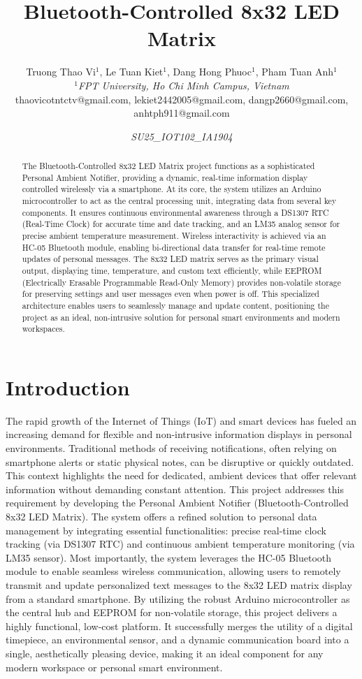 \documentclass[a4paper, 10pt]{article}
\title{\textbf{Bluetooth-Controlled 8x32 LED Matrix}}
\author{
	Truong Thao Vi$^{1}$, Le Tuan Kiet$^{1}$, Dang Hong Phuoc$^{1}$, Pham Tuan Anh$^{1}$ \\
	\small \textit{$^{1}$FPT University, Ho Chi Minh Campus, Vietnam} \\
	\small thaovicotntctv@gmail.com, lekiet2442005@gmail.com, dangp2660@gmail.com, anhtph911@gmail.com
}
\date{\textit{SU25\_IOT102\_IA1904}} %
\begin{document}
	
	\maketitle
	
	\begin{abstract}
		The Bluetooth-Controlled 8x32 LED Matrix project functions as a sophisticated Personal Ambient Notifier, providing a dynamic, real-time information display controlled wirelessly via a smartphone. At its core, the system utilizes an Arduino microcontroller to act as the central processing unit, integrating data from several key components. It ensures continuous environmental awareness through a DS1307 RTC (Real-Time Clock) for accurate time and date tracking, and an LM35 analog sensor for precise ambient temperature measurement. Wireless interactivity is achieved via an HC-05 Bluetooth module, enabling bi-directional data transfer for real-time remote updates of personal messages. The 8x32 LED matrix serves as the primary visual output, displaying time, temperature, and custom text efficiently, while EEPROM (Electrically Erasable Programmable Read-Only Memory) provides non-volatile storage for preserving settings and user messages even when power is off. This specialized architecture enables users to seamlessly manage and update content, positioning the project as an ideal, non-intrusive solution for personal smart environments and modern workspaces.
	\end{abstract}
	
	\section{Introduction}
	The rapid growth of the Internet of Things (IoT) and smart devices has fueled an increasing demand for flexible and non-intrusive information displays in personal environments. Traditional methods of receiving notifications, often relying on smartphone alerts or static physical notes, can be disruptive or quickly outdated. This context highlights the need for dedicated, ambient devices that offer relevant information without demanding constant attention.
	This project addresses this requirement by developing the Personal Ambient Notifier (Bluetooth-Controlled 8x32 LED Matrix). The system offers a refined solution to personal data management by integrating essential functionalities: precise real-time clock tracking (via DS1307 RTC) and continuous ambient temperature monitoring (via LM35 sensor). Most importantly, the system leverages the HC-05 Bluetooth module to enable seamless wireless communication, allowing users to remotely transmit and update personalized text messages to the 8x32 LED matrix display from a standard smartphone.
	By utilizing the robust Arduino microcontroller as the central hub and EEPROM for non-volatile storage, this project delivers a highly functional, low-cost platform. It successfully merges the utility of a digital timepiece, an environmental sensor, and a dynamic communication board into a single, aesthetically pleasing device, making it an ideal component for any modern workspace or personal smart environment.
	
\end{document}
